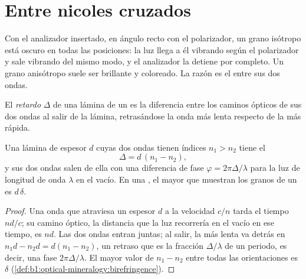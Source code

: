 \section{Entre nicoles cruzados}

Con el analizador insertado, en ángulo recto con el polarizador, un grano isótropo está oscuro en todas las posiciones: la
luz llega a él vibrando según el polarizador y sale vibrando del mismo modo, y el analizador la detiene por completo. Un
grano anisótropo suele ser brillante y coloreado. La razón es el  entre sus dos ondas.

\begin{definition}\label{def:b1:optical-mineralogy:retardation}
El \emph{retardo} $\Delta$ de una lámina de un  es la diferencia
entre los caminos ópticos de sus dos ondas al salir de la lámina, retrasándose la onda más lenta respecto de la más rápida.
\end{definition}

\begin{proposition}\label{prop:b1:optical-mineralogy:retardation}
Una lámina de espesor $d$ cuyas dos ondas tienen índices $n_1 > n_2$ tiene el 
\[
  \Delta = d\,(n_1 - n_2),
\]
y sus dos ondas salen de ella con una diferencia de fase $\varphi = 2\pi\Delta/\lambda$ para la luz de longitud de onda
$\lambda$ en el vacío. En una , el mayor  que muestran los granos de un  es $d\,\delta$.
\end{proposition}

\begin{proof}
Una onda que atraviesa un espesor $d$ a la velocidad $c/n$ tarda el tiempo $nd/c$; su camino óptico, la distancia que la luz
recorrería en el vacío en ese tiempo, es $nd$. Las dos ondas entran juntas; al salir, la más lenta va detrás en
$n_1 d - n_2 d = d(n_1 - n_2)$, un retraso que es la fracción $\Delta/\lambda$ de un periodo, es decir, una fase
$2\pi\Delta/\lambda$. El mayor valor de $n_1 - n_2$ entre todas las orientaciones es $\delta$
(\cref{def:b1:optical-mineralogy:birefringence}).
\end{proof}


